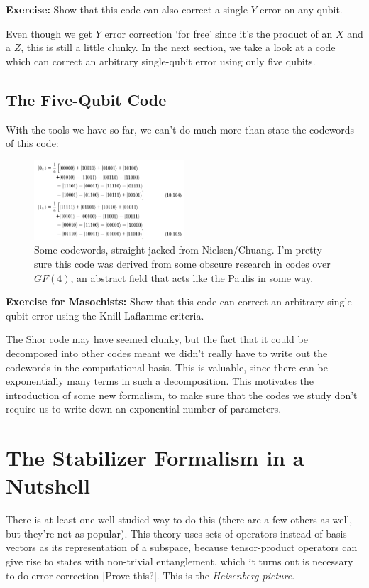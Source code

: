 \documentclass[10pt,a4paper, english]{scrartcl}
\begin{document}
\textbf{Exercise: } Show that this code can also correct a single $Y$ error on any qubit. 

Even though we get $Y$ error correction `for free' since it's the product of an $X$ and a $Z$, this is still a little clunky. In the next section, we take a look at a code which can correct an arbitrary single-qubit error using only five qubits.
\subsection{The Five-Qubit Code}
With the tools we have so far, we can't do much more than state the codewords of this code:
\begin{figure}[!h]
\centering
\includegraphics[width=0.5\textwidth]{five_qubit_codewords.png}
\caption{Some codewords, straight jacked from Nielsen/Chuang. I'm pretty sure this code was derived from some obscure research in codes over $GF(4)$, an abstract field that acts like the Paulis in some way.}
\end{figure}

\textbf{Exercise for Masochists: }Show that this code can correct an arbitrary single-qubit error using the Knill-Laflamme criteria.

The Shor code may have seemed clunky, but the fact that it could be decomposed into other codes meant we didn't really have to write out the codewords in the computational basis.
This is valuable, since there can be exponentially many terms in such a decomposition. 
This motivates the introduction of some new formalism, to make sure that the codes we study don't require us to write down an exponential number of parameters.
\section{The Stabilizer Formalism in a Nutshell}
There is at least one well-studied way to do this (there are a few others as well, but they're not as popular).
This theory uses sets of operators instead of basis vectors as its representation of a subspace, because tensor-product operators can give rise to states with non-trivial entanglement, which it turns out is necessary to do error correction [Prove this?].
This is the \emph{Heisenberg picture}. 
\end{document}
